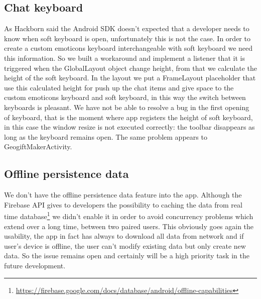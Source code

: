 \subsection{Chat keyboard}
As Hackborn said \cite{Dianne_Hackborn_keyboard} the Android SDK doesn't expected that a developer needs to know when soft keyboard is open, unfortunately this is not the case. In order to create a custom emoticons keyboard interchangeable with soft keyboard we need this information. So we built a workaround and implement a listener that it is triggered when the GlobalLayout object change height, from that we calculate the height of the soft keyboard. In the layout we put a FrameLayout placeholder that use this calculated height for push up the chat items and give space to the custom emoticons keyboard and soft keyboard, in this way the switch between keyboards is pleasant. 
We have not be able to resolve a bug in the first opening of keyboard, that is the moment where app registers the height of soft keyboard, in this case the window resize is not executed correctly: the toolbar disappears as long as the keyboard remains open. The same problem appears to GeogiftMakerActivity.

\subsection{Offline persistence data}
We don't have the offline persistence data feature into the app. Although the Firebase API gives to developers the possibility to caching the data from real time database\footnote{\url{https://firebase.google.com/docs/database/android/offline-capabilities}} we didn't enable it in order to avoid concurrency problems which extend over a long time, between two paired users. This obviously goes again the usability, the app in fact has always to download all data from network and if user's device is offline, the user can't modify existing data but only create new data. So the issue remains open and certainly will be a high priority task in the future development.